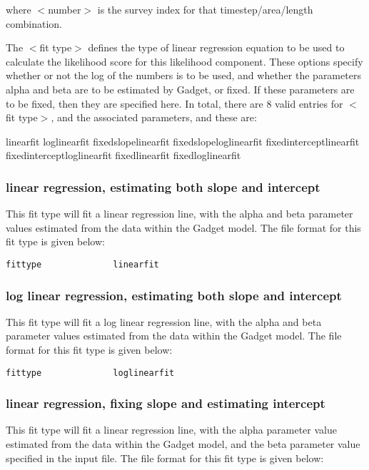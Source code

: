 \documentclass[10pt,twoside]{book}
\begin{document}
where $<$number$>$ is the survey index for that timestep/area/length combination.

\bigskip
The $<$fit type$>$ defines the type of linear regression equation to be used to calculate the likelihood score for this likelihood component.  These options specify whether or not the log of the numbers is to be used, and whether the parameters alpha and beta are to be estimated by Gadget, or fixed.  If these parameters are to be fixed, then they are specified here.  In total, there are 8 valid entries for $<$fit type$>$, and the associated parameters, and these are:

\bigskip
linearfit\newline
loglinearfit\newline
fixedslopelinearfit\newline
fixedslopeloglinearfit\newline
fixedinterceptlinearfit\newline
fixedinterceptloglinearfit\newline
fixedlinearfit\newline
fixedloglinearfit

\subsubsection{linear regression, estimating both slope and intercept}
This fit type will fit a linear regression line, with the alpha and beta parameter values estimated from the data within the Gadget model.  The file format for this fit type is given below:
{\small\begin{verbatim}
fittype              linearfit
\end{verbatim}}

\subsubsection{log linear regression, estimating both slope and intercept}
This fit type will fit a log linear regression line, with the alpha and beta parameter values estimated from the data within the Gadget model.  The file format for this fit type is given below:

{\small\begin{verbatim}
fittype              loglinearfit
\end{verbatim}}

\subsubsection{linear regression, fixing slope and estimating intercept}
This fit type will fit a linear regression line, with the alpha parameter value estimated from the data within the Gadget model, and the beta parameter value specified in the input file.  The file format for this fit type is given below:
\end{document}
